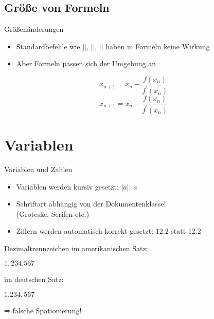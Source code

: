 \documentclass[
	vorläufig=true,
	datum=2016-11-04,
	titel={Mathematiksatz I},
	web=false,
]{../tex/latexkurs-slides}
\begin{document}
\subsection{Größe von Formeln}
\begin{frame}[fragile]{Größenänderungen}
	\begin{itemize}
		\item Standardbefehle wie |\small|,  |\tiny|, |\Huge| haben in Formeln keine Wirkung
		\item Aber Formeln passen sich der Umgebung an
	\end{itemize} 
	\pause
\begin{LTXexample}[pos=b]
\small \[ 
  x_{n+1} = x_n - \frac{f(x_n)}{f^\prime(x_n)} 
\]
\huge \[
  x_{n+1} = x_n - \frac{f(x_n)}{f^\prime(x_n)}
\]
\end{LTXexample}
\end{frame}

\section{Variablen}
\begin{frame}[fragile]{Variablen und Zahlen}
	\begin{itemize}
		\item Variablen werden kursiv gesetzt: |$a$|: $a$
		\item Schriftart abhängig von der Dokumentenklasse!\\%
		(Groteske, Serifen etc.)
		\item Ziffern werden automatisch korrekt gesetzt: $12.2$ statt 12.2
	\end{itemize}
\end{frame}

\begin{frame}[fragile]{Dezimaltrennzeichen}
im amerikanischen Satz:
\begin{LTXexample}[preset=\Large]
$1,234.567$
\end{LTXexample}\pause
im deutschen Satz:
\begin{LTXexample}[preset=\Large]
$1.234,567$
\end{LTXexample}
\alert{⇒ falsche Spationierung!}
\end{frame}
\end{document}
